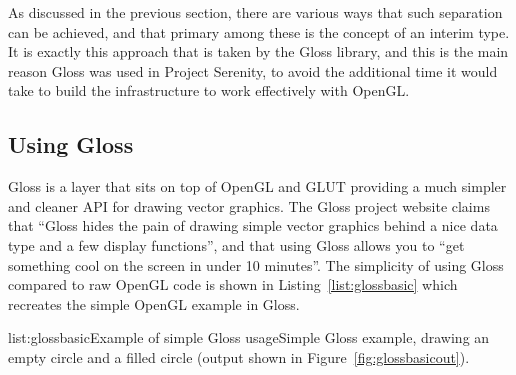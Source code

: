 As discussed in the previous section, there are various ways that such separation can be achieved, and that primary among these is the concept of an interim type. It is exactly this approach that is taken by the Gloss library, and this is the main reason Gloss was used in Project Serenity, to avoid the additional time it would take to build the infrastructure to work effectively with OpenGL.

\subsection{Using Gloss}

Gloss is a layer that sits on top of OpenGL and GLUT providing a much simpler and cleaner API for drawing vector graphics. The Gloss project website claims that ``Gloss hides the pain of drawing simple vector graphics behind a nice data type and a few display functions'', and that using Gloss allows you to ``get something cool on the screen in under 10 minutes''. The simplicity of using Gloss compared to raw OpenGL code is shown in Listing~\ref{list:glossbasic} which recreates the simple OpenGL example in Gloss.

\vspace{-0.5em}
\begin{listing}{list:glossbasic}{Example of simple Gloss usage}{Simple Gloss example, drawing an empty circle and a filled circle (output shown in Figure~\ref{fig:glossbasicout}).}{}
\end{listing}\vspace{-1.5em}

